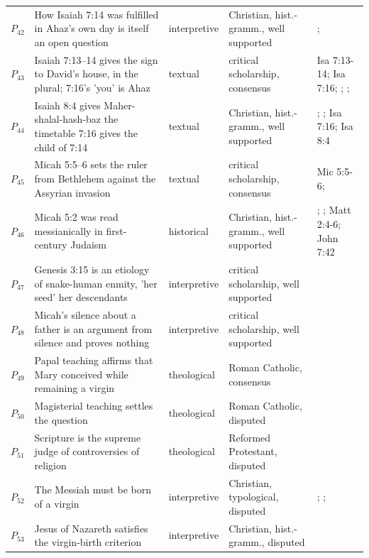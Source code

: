 \documentclass[11pt]{article}
\begin{document}
\begin{longtable}{@{}r >{\raggedright\arraybackslash}p{} l >{\raggedright\arraybackslash}p{} >{\raggedright\arraybackslash}p{}@{}}
$P_{42}$ & How Isaiah 7:14 was fulfilled in Ahaz's own day is itself an open question & interpretive & Christian, hist.-gramm., well supported & \cite[1653--1654]{berry-virgin-birth-2003}; \cite[5--9]{compton-immanuel-prophecy-2007} \\
$P_{43}$ & Isaiah 7:13–14 gives the sign to David's house, in the plural; 7:16's 'you' is Ahaz & textual & critical scholarship, consensus & Isa 7:13-14; Isa 7:16; \cite[12]{compton-immanuel-prophecy-2007}; \cite[112]{young-immanuel-prophecy-1953}; \cite[122]{motyer-context-content-1970} \\
$P_{44}$ & Isaiah 8:4 gives Maher-shalal-hash-baz the timetable 7:16 gives the child of 7:14 & textual & Christian, hist.-gramm., well supported & \cite[124]{motyer-context-content-1970}; \cite[13]{compton-immanuel-prophecy-2007}; Isa 7:16; Isa 8:4 \\
$P_{45}$ & Micah 5:5–6 sets the ruler from Bethlehem against the Assyrian invasion & textual & critical scholarship, consensus & Mic 5:5-6; \cite[481]{postell-isaiah-messianic-2025} \\
$P_{46}$ & Micah 5:2 was read messianically in first-century Judaism & historical & Christian, hist.-gramm., well supported & \cite[481]{postell-isaiah-messianic-2025}; \cite[26]{brown-problem-virginal-conception-1972}; Matt 2:4-6; John 7:42 \\
$P_{47}$ & Genesis 3:15 is an etiology of snake-human enmity, 'her seed' her descendants & interpretive & critical scholarship, well supported & \cite{brown-birth-messiah-1993} \\
$P_{48}$ & Micah's silence about a father is an argument from silence and proves nothing & interpretive & critical scholarship, well supported & \cite{brown-birth-messiah-1993} \\
$P_{49}$ & Papal teaching affirms that Mary conceived while remaining a virgin & theological & Roman Catholic, consensus & \cite[23]{miravalle-introduction-mary-2020} \\
$P_{50}$ & Magisterial teaching settles the question & theological & Roman Catholic, disputed & \cite[23]{miravalle-introduction-mary-2020} \\
$P_{51}$ & Scripture is the supreme judge of controversies of religion & theological & Reformed Protestant, disputed & \cite[I.x]{westminster-confession-1647} \\
$P_{52}$ & The Messiah must be born of a virgin & interpretive & Christian, typological, disputed & \cite[ad loc. Isa 7:14]{motyer-isaiah-1993}; \cite[ad loc. Matt 1:23]{france-matthew-2007}; \cite[9--10]{miravalle-meet-mary-2007} \\
$P_{53}$ & Jesus of Nazareth satisfies the virgin-birth criterion & interpretive & Christian, hist.-gramm., disputed & \cite[ad loc. Matt 1:23]{france-matthew-2007} \\
\bottomrule
\end{longtable}
\end{document}
